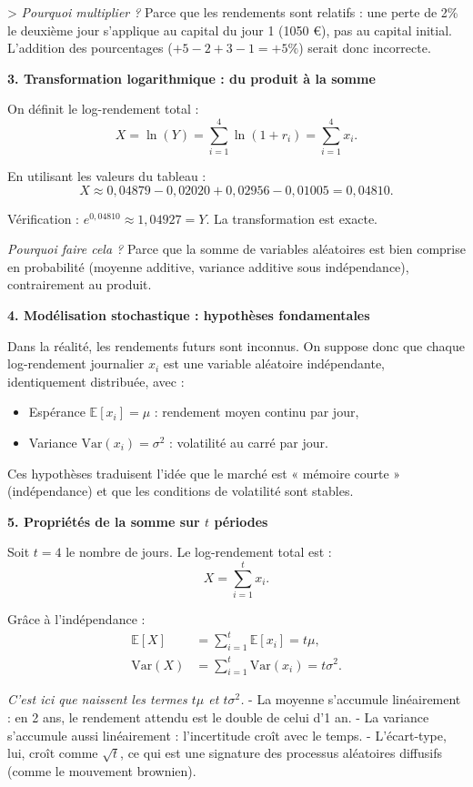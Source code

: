 \begin{examplebox}
> \textit{Pourquoi multiplier ?} Parce que les rendements sont relatifs : une perte de 2\% le deuxième jour s’applique au capital du jour 1 (1050 €), pas au capital initial. L’addition des pourcentages (\( +5 -2 +3 -1 = +5\% \)) serait donc incorrecte.

\medskip
\noindent \textbf{3. Transformation logarithmique : du produit à la somme}

On définit le log-rendement total :
\[
X = \ln(Y) = \sum_{i=1}^{4} \ln(1 + r_i) = \sum_{i=1}^{4} x_i.
\]

En utilisant les valeurs du tableau :
\[
X \approx 0{,}04879 - 0{,}02020 + 0{,}02956 - 0{,}01005 = 0{,}04810.
\]

Vérification : \( e^{0{,}04810} \approx 1{,}04927 = Y \). La transformation est exacte.

 \textit{Pourquoi faire cela ?} Parce que la somme de variables aléatoires est bien comprise en probabilité (moyenne additive, variance additive sous indépendance), contrairement au produit.

\medskip
\noindent \textbf{4. Modélisation stochastique : hypothèses fondamentales}

Dans la réalité, les rendements futurs sont inconnus. On suppose donc que chaque log-rendement journalier \( x_i \) est une variable aléatoire indépendante, identiquement distribuée, avec :
\begin{itemize}
    \item Espérance \( \mathbb{E}[x_i] = \mu \) : rendement moyen continu par jour,
    \item Variance \( \text{Var}(x_i) = \sigma^2 \) : volatilité au carré par jour.
\end{itemize}

Ces hypothèses traduisent l’idée que le marché est « mémoire courte » (indépendance) et que les conditions de volatilité sont stables.

\medskip
\noindent \textbf{5. Propriétés de la somme sur \( t \) périodes}

Soit \( t = 4 \) le nombre de jours. Le log-rendement total est :
\[
X = \sum_{i=1}^{t} x_i.
\]

Grâce à l’indépendance :
\[
\begin{aligned}
\mathbb{E}[X] &= \sum_{i=1}^{t} \mathbb{E}[x_i] = t \mu, \\
\text{Var}(X) &= \sum_{i=1}^{t} \text{Var}(x_i) = t \sigma^2.
\end{aligned}
\]

 \textit{C’est ici que naissent les termes \( t\mu \) et \( t\sigma^2 \).}  
 - La moyenne s’accumule linéairement : en 2 ans, le rendement attendu est le double de celui d’1 an.  
 - La variance s’accumule aussi linéairement : l’incertitude croît avec le temps.  
 - L’écart-type, lui, croît comme \( \sqrt{t} \), ce qui est une signature des processus aléatoires diffusifs (comme le mouvement brownien).


\end{examplebox}
